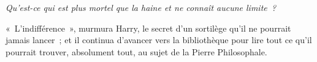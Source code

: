 \emph{Qu'est-ce qui est plus mortel que la haine et ne connaît aucune limite~?}

«~L'indifférence~», murmura Harry, le secret d'un sortilège qu'il ne pourrait jamais lancer~; et il continua d'avancer vers la bibliothèque pour lire tout ce qu'il pourrait trouver, absolument tout, au sujet de la Pierre Philosophale.

